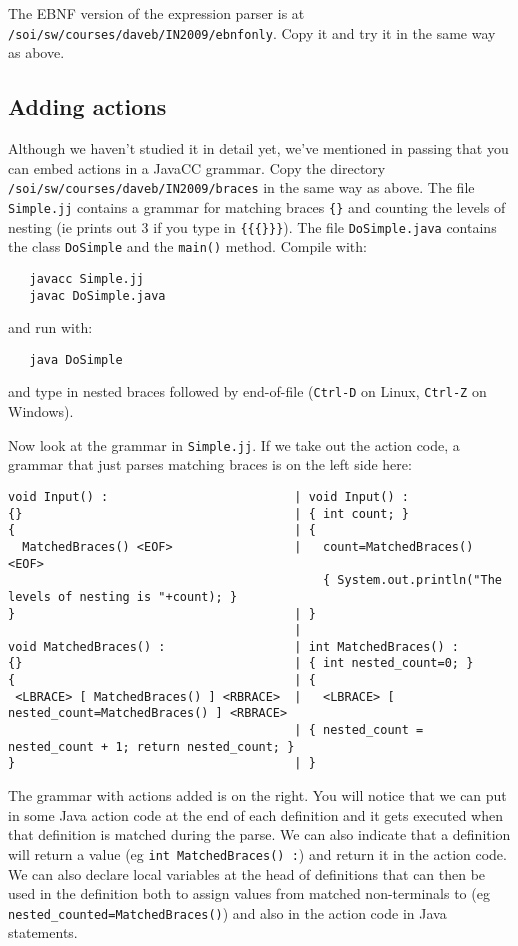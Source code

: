 \documentclass{article}
\begin{document}
The EBNF version of the expression parser is at
\verb+/soi/sw/courses/daveb/IN2009/ebnfonly+. Copy it
and try it in the same way as above.

\subsection*{Adding actions}

Although we haven't studied it in detail yet, we've mentioned
in passing that you can embed actions in a JavaCC grammar.
Copy the directory \verb+/soi/sw/courses/daveb/IN2009/braces+ 
in the same way as above. The file \verb+Simple.jj+ contains
a grammar for matching braces \verb+{}+ and counting the levels
of nesting (ie prints out 3 if you type in \verb+{{{}}}+). 
The file \verb+DoSimple.java+ contains the class \verb+DoSimple+ 
and the \verb+main()+ method. Compile with:
\begin{verbatim}
   javacc Simple.jj
   javac DoSimple.java
\end{verbatim}
and run with:
\begin{verbatim}
   java DoSimple
\end{verbatim}
and type in nested braces followed by end-of-file (\verb+Ctrl-D+
on Linux, \verb+Ctrl-Z+ on Windows).

Now look at the grammar in \verb+Simple.jj+. If we take out
the action code, a grammar that just parses matching braces
is on the left side here:
\begin{small}
\begin{verbatim}
void Input() :                          | void Input() :
{}                                      | { int count; }
{                                       | {
  MatchedBraces() <EOF>                 |   count=MatchedBraces() <EOF>
                                            { System.out.println("The levels of nesting is "+count); }
}                                       | }
                                        |
void MatchedBraces() :                  | int MatchedBraces() :
{}                                      | { int nested_count=0; }
{                                       | {
 <LBRACE> [ MatchedBraces() ] <RBRACE>  |   <LBRACE> [ nested_count=MatchedBraces() ] <RBRACE>
                                        | { nested_count = nested_count + 1; return nested_count; }
}                                       | }
\end{verbatim}
\end{small}
The grammar with actions added is on the right.
You will notice that we can put in some Java action code at the end
of each definition and it gets executed when that definition 
is matched during the parse. We can also indicate that 
a definition will return a value (eg \verb+int MatchedBraces() :+) and
return it in the action code.
We can also declare local variables at the head of definitions
that can then be used in the definition both to assign values
from matched non-terminals to (eg \verb+nested_counted=MatchedBraces()+)
and also in the action code in Java statements.
\end{document}
